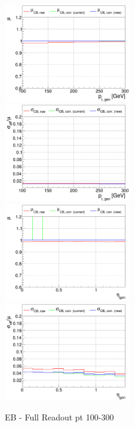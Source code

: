 \begin{figure}
\includegraphics[width=0.495\textwidth]{./ECAL_plots/plotsNOPU/EB/FULL/pdf/GENPT/EBFULL_GENPT_0100_0300_MuOverBins.pdf}
\includegraphics[width=0.495\textwidth]{./ECAL_plots/plotsPU/EB/FULL/pdf/GENPT/EBFULL_GENPT_0100_0300_EffSigmaOverBins.pdf}
\includegraphics[width=0.495\textwidth]{./ECAL_plots/plotsNOPU/EB/FULL/pdf/GENETA/EBFULL_GENETA_0100_0300_MuOverBins.pdf}
\includegraphics[width=0.495\textwidth]{./ECAL_plots/plotsNOPU/EB/FULL/pdf/GENETA/EBFULL_GENETA_0005_0020_EffSigmaOverBins.pdf}
\caption{EB - Full Readout pt 100-300}
\end{figure}




